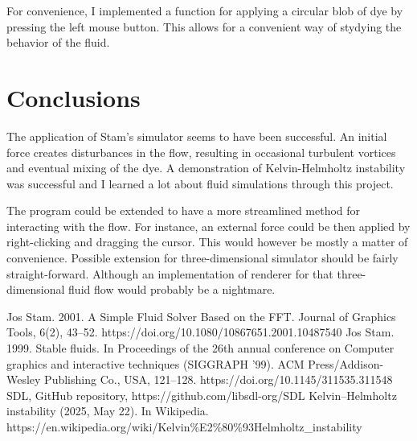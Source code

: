 \documentclass[12pt, letterpaper]{article}
\begin{document}
For convenience, I implemented a function for applying a circular blob of dye by pressing the left mouse button.
This allows for a convenient way of stydying the behavior of the fluid.

\section{Conclusions}
The application of Stam's simulator seems to have been successful.
An initial force creates disturbances in the flow, resulting in occasional turbulent vortices and eventual mixing of the dye.
A demonstration of Kelvin-Helmholtz instability was successful and I learned a lot about fluid simulations through this project.

The program could be extended to have a more streamlined method for interacting with the flow.
For instance, an external force could be then applied by right-clicking and dragging the cursor.
This would however be mostly a matter of convenience.
Possible extension for three-dimensional simulator should be fairly straight-forward.
Although an implementation of renderer for that three-dimensional fluid flow would probably be a nightmare.
\begin{thebibliography}{9}
    Jos Stam. 2001. A Simple Fluid Solver Based on the FFT. Journal of Graphics Tools, 6(2), 43–52. https://doi.org/10.1080/10867651.2001.10487540
    Jos Stam. 1999. Stable fluids. In Proceedings of the 26th annual conference on Computer graphics and interactive techniques (SIGGRAPH '99). ACM Press/Addison-Wesley Publishing Co., USA, 121–128. https://doi.org/10.1145/311535.311548
    SDL, GitHub repository, https://github.com/libsdl-org/SDL
    Kelvin–Helmholtz instability (2025, May 22). In Wikipedia. \\
    https://en.wikipedia.org/wiki/Kelvin\%E2\%80\%93Helmholtz\_instability
\end{thebibliography}
\end{document}
